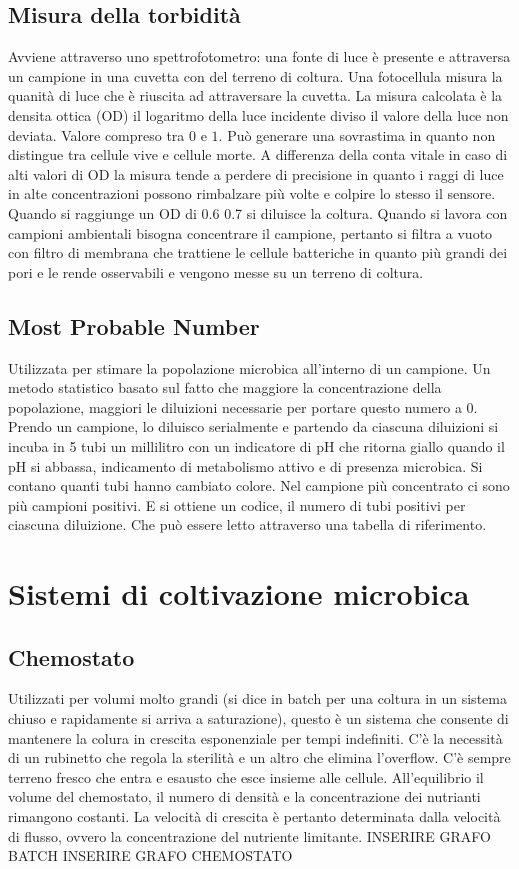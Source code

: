 \subsection{Misura della torbidit\`a}
Avviene attraverso uno spettrofotometro: una fonte di luce \`e presente e attraversa un campione in una cuvetta con del terreno di coltura. Una fotocellula misura la quanit\`a di luce
che \`e riuscita ad attraversare la cuvetta. La misura calcolata \`e la densita ottica (OD) il logaritmo della luce incidente diviso il valore della luce non deviata. Valore compreso 
tra $0$ e $1$. Pu\`o generare una sovrastima in quanto non distingue tra cellule vive e cellule morte. A differenza della conta vitale in caso di alti valori di OD la misura tende a 
perdere di precisione in quanto i raggi di luce in alte concentrazioni possono rimbalzare pi\`u volte e colpire lo stesso il sensore. Quando si raggiunge un OD di 0.6 0.7 si diluisce
la coltura. 
Quando si lavora con campioni ambientali bisogna concentrare il campione, pertanto si filtra a vuoto con filtro di membrana che trattiene le cellule batteriche in quanto pi\`u grandi
dei pori e le rende osservabili e vengono messe su un terreno di coltura. 
\subsection{Most Probable Number}
Utilizzata per stimare la popolazione microbica all'interno di un campione. Un metodo statistico basato sul fatto che maggiore la concentrazione della popolazione, maggiori le diluizioni
necessarie per portare questo numero a $0$. Prendo un campione, lo diluisco serialmente e partendo da ciascuna diluizioni si incuba in 5 tubi un millilitro con un indicatore di pH che
ritorna giallo quando il pH si abbassa, indicamento di metabolismo attivo e di presenza microbica. Si contano quanti tubi hanno cambiato colore. Nel campione pi\`u concentrato ci sono
pi\`u campioni positivi. E si ottiene un codice, il numero di tubi positivi per ciascuna diluizione. Che pu\`o essere letto attraverso una tabella di riferimento. 
\section{Sistemi di coltivazione microbica}
\subsection{Chemostato}
Utilizzati per volumi molto grandi (si dice in batch per una coltura in un sistema chiuso e rapidamente si arriva a saturazione), questo \`e un sistema che consente di mantenere la 
colura in crescita esponenziale per tempi indefiniti. C'\`e la necessit\`a di un rubinetto che regola la sterilit\`a e un altro che elimina l'overflow. C'\`e sempre terreno fresco che
entra e esausto che esce insieme alle cellule. All'equilibrio il volume del chemostato, il numero di densit\`a e la concentrazione dei nutrianti rimangono costanti. La velocit\`a di 
crescita \`e pertanto determinata dalla velocit\` a di flusso, ovvero la concentrazione del nutriente limitante. 
INSERIRE GRAFO BATCH
INSERIRE GRAFO CHEMOSTATO
